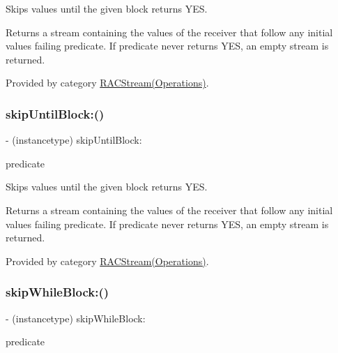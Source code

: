 Skips values until the given block returns {\ttfamily Y\+ES}.

Returns a stream containing the values of the receiver that follow any initial values failing {\ttfamily predicate}. If {\ttfamily predicate} never returns {\ttfamily Y\+ES}, an empty stream is returned. 

Provided by category \mbox{\hyperlink{category_r_a_c_stream_07_operations_08_a008935d03ebc55b40b461dc080cddd38}{R\+A\+C\+Stream(\+Operations)}}.

\mbox{\label{interface_r_a_c_stream_a008935d03ebc55b40b461dc080cddd38}} 
\subsubsection{\texorpdfstring{skip\+Until\+Block\+:()}{skipUntilBlock:()}\hspace{0.1cm}{\footnotesize\ttfamily [3/3]}}
{\footnotesize\ttfamily -\/ (instancetype) skip\+Until\+Block\+: \begin{DoxyParamCaption}\item[{(B\+O\+OL($^\wedge$)(id x))}]{predicate }\end{DoxyParamCaption}}

Skips values until the given block returns {\ttfamily Y\+ES}.

Returns a stream containing the values of the receiver that follow any initial values failing {\ttfamily predicate}. If {\ttfamily predicate} never returns {\ttfamily Y\+ES}, an empty stream is returned. 

Provided by category \mbox{\hyperlink{category_r_a_c_stream_07_operations_08_a008935d03ebc55b40b461dc080cddd38}{R\+A\+C\+Stream(\+Operations)}}.

\mbox{\label{interface_r_a_c_stream_a1e323c308071aed5e01627d4d96ca9c8}} 
\subsubsection{\texorpdfstring{skip\+While\+Block\+:()}{skipWhileBlock:()}\hspace{0.1cm}{\footnotesize\ttfamily [1/3]}}
{\footnotesize\ttfamily -\/ (instancetype) skip\+While\+Block\+: \begin{DoxyParamCaption}\item[{(B\+O\+OL($^\wedge$)(id x))}]{predicate }\end{DoxyParamCaption}}


